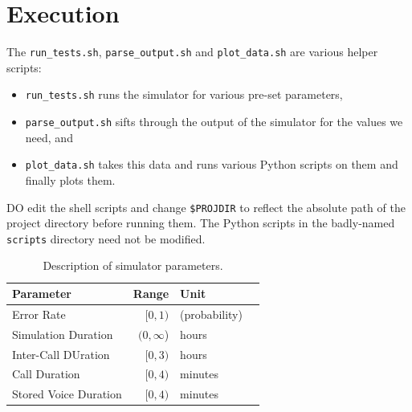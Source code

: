 \documentclass[a4]{article}
\begin{document}
\section{Execution}
The \texttt{run\_tests.sh}, \texttt{parse\_output.sh} and 
\texttt{plot\_data.sh} are various helper scripts:
\begin{itemize}
	\item \texttt{run\_tests.sh} runs the simulator for various
	pre-set parameters, 
	\item \texttt{parse\_output.sh} sifts through the output of the
	simulator for the values we need, and 
	\item \texttt{plot\_data.sh} takes this data and runs various Python 
	scripts on them and finally plots them.
\end{itemize}
DO edit the shell scripts and change \texttt{\$PROJDIR} to reflect the 
absolute path of the project directory before running them. The Python
scripts in the badly-named \texttt{scripts} directory need not be 
modified.

\begin{table}[m]
\centering
\begin{tabular}{|l|r|l|m{}}
	\hline
	Parameter & Range & Unit \\ \hline
	Error Rate & $[0, 1)$ & (probability) \\
	Simulation Duration & $(0, \infty$) & hours \\
	Inter-Call DUration & $[0, 3)$ & hours \\
	Call Duration & $[0, 4)$ & minutes \\
	Stored Voice Duration & $[0, 4)$ & minutes \\ \hline
\end{tabular}
\caption{Description of simulator parameters.}
\label{table:params}
\end{table}
\end{document}
